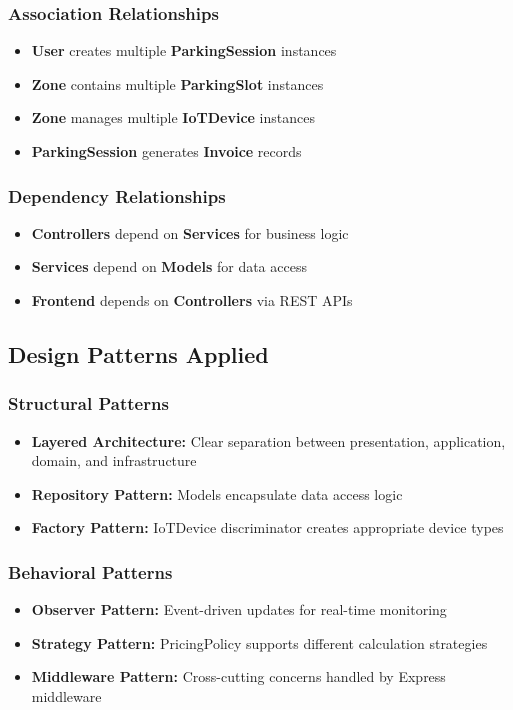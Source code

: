\subsubsection{Association Relationships}
\begin{itemize}
\item \textbf{User} creates multiple \textbf{ParkingSession} instances
\item \textbf{Zone} contains multiple \textbf{ParkingSlot} instances
\item \textbf{Zone} manages multiple \textbf{IoTDevice} instances
\item \textbf{ParkingSession} generates \textbf{Invoice} records
\end{itemize}

\subsubsection{Dependency Relationships}
\begin{itemize}
\item \textbf{Controllers} depend on \textbf{Services} for business logic
\item \textbf{Services} depend on \textbf{Models} for data access
\item \textbf{Frontend} depends on \textbf{Controllers} via REST APIs
\end{itemize}

\subsection{Design Patterns Applied}

\subsubsection{Structural Patterns}
\begin{itemize}
\item \textbf{Layered Architecture:} Clear separation between presentation, application, domain, and infrastructure
\item \textbf{Repository Pattern:} Models encapsulate data access logic
\item \textbf{Factory Pattern:} IoTDevice discriminator creates appropriate device types
\end{itemize}

\subsubsection{Behavioral Patterns}
\begin{itemize}
\item \textbf{Observer Pattern:} Event-driven updates for real-time monitoring
\item \textbf{Strategy Pattern:} PricingPolicy supports different calculation strategies
\item \textbf{Middleware Pattern:} Cross-cutting concerns handled by Express middleware
\end{itemize}

